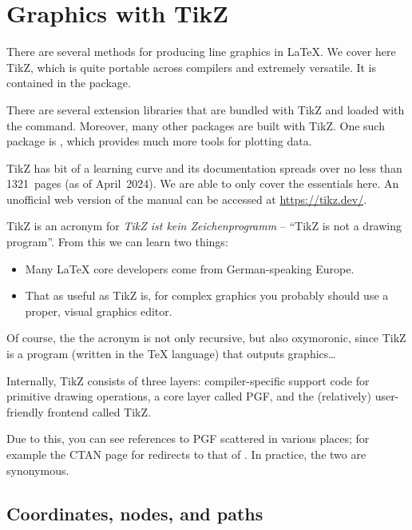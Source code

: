 \chapter{Graphics with TikZ}

There are several methods for producing line graphics in \LaTeX.
We cover here TikZ, which is quite portable across compilers and extremely versatile.
It is contained in the  package.

There are several extension libraries that are bundled with TikZ and loaded with the  command.
Moreover, many other packages are built with TikZ.
One such package is , which provides much more tools for plotting data.

TikZ has bit of a learning curve
and its documentation spreads over no less than 1321~pages (as of April~2024).
We are able to only cover the essentials here.
An unofficial web version of the manual can be accessed at \url{https://tikz.dev/}.

\begin{technote}
TikZ is an acronym for \emph{TikZ ist kein Zeichenprogramm}
-- ``TikZ is not a drawing program''.
From this we can learn two things:
\begin{itemize}
\item Many \LaTeX{} core developers come from German-speaking Europe.
\item That as useful as TikZ is,
    for complex graphics you probably should use a proper, visual graphics editor.
\end{itemize}
Of course, the the acronym is not only recursive,
but also oxymoronic, since TikZ is a program (written in the \TeX{} language)
that outputs graphics\dots
\end{technote}

\begin{technote}
Internally, TikZ consists of three layers:
compiler-specific support code for primitive drawing operations,
a core layer called PGF,
and the (relatively) user-friendly frontend called TikZ.

Due to this, you can see references to PGF scattered in various places;
for example the CTAN page for  redirects to that of .
In practice, the two are synonymous.
\end{technote}


%
%
\section{Coordinates, nodes, and paths}

